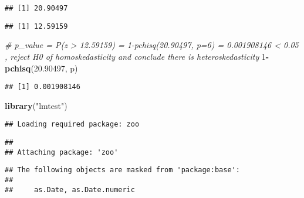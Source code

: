 \documentclass[
]{article}
\newenvironment{Shaded}{\begin{snugshade}}{\end{snugshade}}
\newcommand{\CommentTok}[1]{\textcolor[rgb]{0.56,0.35,0.01}{\textit{#1}}}
\newcommand{\DataTypeTok}[1]{\textcolor[rgb]{0.13,0.29,0.53}{#1}}
\newcommand{\DecValTok}[1]{\textcolor[rgb]{0.00,0.00,0.81}{#1}}
\newcommand{\FloatTok}[1]{\textcolor[rgb]{0.00,0.00,0.81}{#1}}
\newcommand{\KeywordTok}[1]{\textcolor[rgb]{0.13,0.29,0.53}{\textbf{#1}}}
\newcommand{\NormalTok}[1]{#1}
\newcommand{\OperatorTok}[1]{\textcolor[rgb]{0.81,0.36,0.00}{\textbf{#1}}}
\newcommand{\StringTok}[1]{\textcolor[rgb]{0.31,0.60,0.02}{#1}}
\begin{document}
\begin{verbatim}
## [1] 20.90497
\end{verbatim}

\begin{Shaded}
\end{Shaded}

\begin{verbatim}
## [1] 12.59159
\end{verbatim}

\begin{Shaded}
\begin{Highlighting}[]
\CommentTok{# p_value = P(z > 12.59159) = 1-pchisq(20.90497, p=6) = 0.001908146 < 0.05 ,  reject H0 of homoskedasticity and conclude there is heteroskedasticity}
\DecValTok{1}\OperatorTok{-}\KeywordTok{pchisq}\NormalTok{(}\FloatTok{20.90497}\NormalTok{, p)}
\end{Highlighting}
\end{Shaded}

\begin{verbatim}
## [1] 0.001908146
\end{verbatim}

\begin{Shaded}
\begin{Highlighting}[]
\KeywordTok{library}\NormalTok{(}\StringTok{"lmtest"}\NormalTok{)}
\end{Highlighting}
\end{Shaded}

\begin{verbatim}
## Loading required package: zoo
\end{verbatim}

\begin{verbatim}
## 
## Attaching package: 'zoo'
\end{verbatim}

\begin{verbatim}
## The following objects are masked from 'package:base':
## 
##     as.Date, as.Date.numeric
\end{verbatim}
\end{document}
